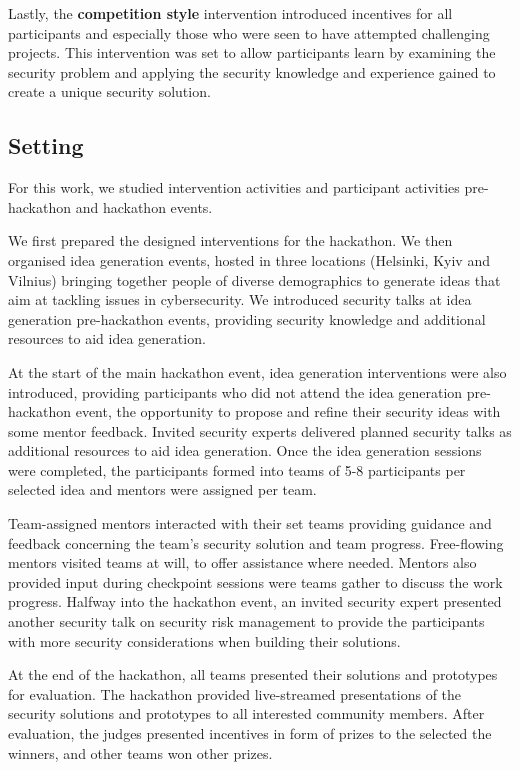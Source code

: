 \documentclass[runningheads]{llncs}
\begin{document}
Lastly, the \textbf{competition style} intervention introduced incentives for all participants and especially those who were seen to have attempted challenging projects. This intervention was set to allow participants learn by examining the security problem and applying the security knowledge and experience gained to create a unique security solution.


\subsection{Setting}\label{Sec:setting}
For this work, we studied intervention activities and participant activities pre-hackathon and hackathon events.

We first prepared the designed interventions for the hackathon. We then organised idea generation events, hosted in three locations (Helsinki, Kyiv and Vilnius) bringing together people of diverse demographics to generate ideas that aim at tackling issues in cybersecurity. We introduced security talks at idea generation pre-hackathon events, providing security knowledge and additional resources to aid idea generation.

At the start of the main hackathon event, idea generation interventions were also introduced, providing participants who did not attend the idea generation pre-hackathon event, the opportunity to propose and refine their security ideas with some mentor feedback. Invited security experts delivered planned security talks as additional resources to aid idea generation. 
Once the idea generation sessions were completed, the participants formed into teams of 5-8 participants per selected idea and mentors were assigned per team.

Team-assigned mentors interacted with their set teams providing guidance and feedback concerning the team's security solution and team progress. Free-flowing mentors visited teams at will, to offer assistance where needed. Mentors also provided input during checkpoint sessions were teams gather to discuss the work progress.
Halfway into the hackathon event, an invited security expert presented another security talk on security risk management to provide the participants with more security considerations when building their solutions.

At the end of the hackathon, all teams presented their solutions and prototypes for evaluation. The hackathon provided live-streamed presentations of the security solutions and prototypes to all interested community members. After evaluation, the judges presented incentives in form of prizes to the selected the winners, and other teams won other prizes.
\end{document}
